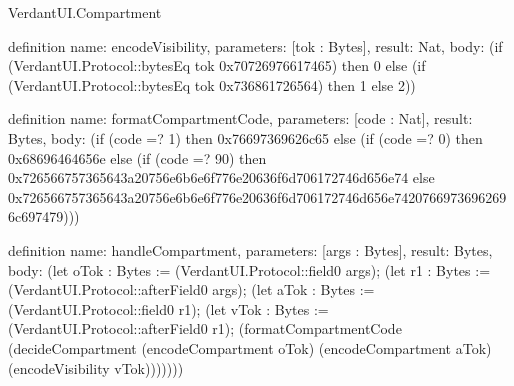 \begin{lexlean}{VerdantUI.Compartment}
\begin{semanticmodule}
definition{
  name: encodeVisibility,
  parameters: [tok : Bytes],
  result: Nat,
  body: (if (VerdantUI.Protocol::bytesEq tok 0x70726976617465) then 0 else
    (if (VerdantUI.Protocol::bytesEq tok 0x736861726564) then 1 else 2))
}

definition{
  name: formatCompartmentCode,
  parameters: [code : Nat],
  result: Bytes,
  body: (if (code =? 1) then 0x76697369626c65 else
    (if (code =? 0) then 0x68696464656e else
    (if (code =? 90) then 0x726566757365643a20756e6b6e6f776e20636f6d706172746d656e74 else
    0x726566757365643a20756e6b6e6f776e20636f6d706172746d656e74207669736962696c697479)))
}

definition{
  name: handleCompartment,
  parameters: [args : Bytes],
  result: Bytes,
  body: (let oTok : Bytes := (VerdantUI.Protocol::field0 args);
    (let r1 : Bytes := (VerdantUI.Protocol::afterField0 args);
    (let aTok : Bytes := (VerdantUI.Protocol::field0 r1);
    (let vTok : Bytes := (VerdantUI.Protocol::afterField0 r1);
    (formatCompartmentCode (decideCompartment (encodeCompartment oTok) (encodeCompartment aTok) (encodeVisibility vTok)))))))
}
\end{semanticmodule}
\end{lexlean}

